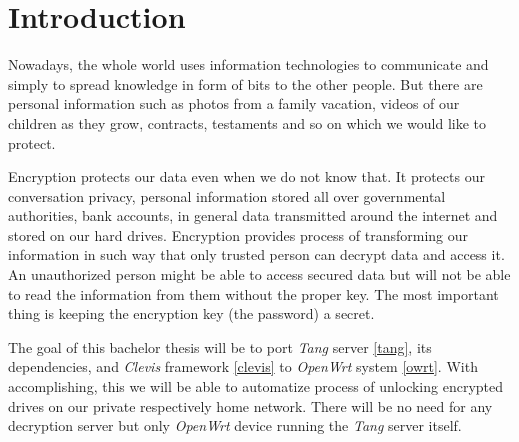 \documentclass[../xdudla00-porting-Tang-to-Open-WRT.tex]{subfiles}
\begin{document}

\chapter{Introduction}\label{introduction}

Nowadays, the whole world uses information technologies to communicate and simply to spread knowledge in form of bits to the other people.  But there are personal information such as photos from a family vacation, videos of our children as they grow, contracts, testaments and so on which we would like to protect.

Encryption protects our data even when we do not know that. It protects our conversation privacy, personal information stored all over governmental authorities, bank accounts, in general data transmitted around the internet and stored on our hard drives. Encryption provides process of transforming our information in such way that only trusted person can decrypt data and access it. An unauthorized person might be able to access secured data but will not be able to read the information from them without the proper key. The most important thing is keeping the encryption key (the password) a secret.

The goal of this bachelor thesis will be to port %
{\it Tang} server \ref{tang}, its dependencies, and {\it Clevis} framework \ref{clevis} to {\it OpenWrt} system \ref{owrt}. With accomplishing, this we will be able to automatize process of unlocking encrypted drives on our private respectively home network. There will be no need for any decryption server but only {\it OpenWrt} device running the {\it Tang} server itself.


\end{document}
